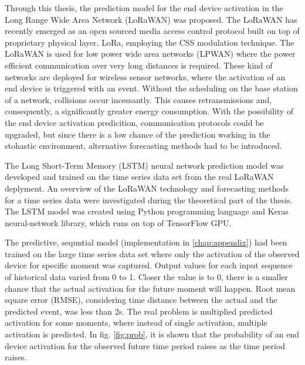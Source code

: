 Through this thesis, the prediction model for the end device activation in the Long Range Wide Area Network (LoRaWAN) was proposed.
The LoRaWAN has recently emerged as an open sourced media access control protocol built on top of proprietary physical layer, LoRa, employing the CSS modulation technique.
The LoRaWAN is used for low power wide area networks (LPWAN) where the power efficient communication over very long distances is required.
These kind of networks are deployed for wireless sensor networks, where the activation of an end device is triggered with an event.
Without the scheduling on the base station of a network, collisions occur incessantly.  
This causes retransmissions and, consequently, a significantly greater energy consumption.
With the possibility of the end device activation predicition, communication protocols could be upgraded, but since there is a low chance of the prediction working in the stohastic environment, alternative forecasting methods had to be introduced.

The Long Short-Term Memory (LSTM) neural network prediction model was developed and trained on the time series data set from the real LoRaWAN deplyment. 
An overview of the LoRaWAN technology and forecasting methods for a time series data were investigated during the theoretical part of the thesis. 
The LSTM model was created using Python programming language and Keras neural-network library, which runs on top of TensorFlow GPU. 

The predictive, sequntial model (implementation in \autoref{chap:appendix}) had been trained on the large time series data set where only the activation of the observed device for specific moment was captured.
Output values for each input sequence of historical data varied from 0 to 1.
Closer the value is to 0, there is a smaller chance that the actual activation for the future moment will happen.
Root mean square error (RMSE), considering time distance between the actual and the predicted event, was less than 2s.
The real problem is multiplied predicted activation for some moments, where instead of single activation, multiple activation is predicted.
In fig. \ref{fig:prob}, it is shown that the probability of an end device activation for the observed future time period raises as the time period raises.

